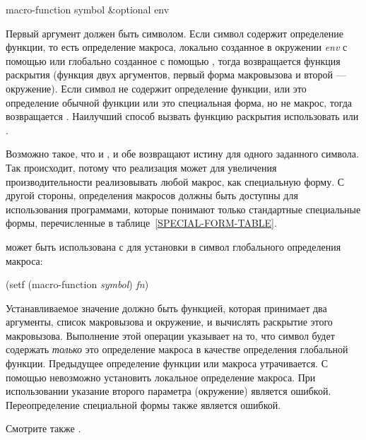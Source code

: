 \begin{defun}[Функция]
macro-function symbol &optional env

Первый аргумент должен быть символом. Если символ содержит определение функции,
то есть определение макроса, локально созданное в окружении \emph{env} с помощью
 или глобально созданное с помощью , тогда
возвращается функция раскрытия (функция двух аргументов, первый форма
макровызова и второй --- окружение).
Если символ не содержит определение функции, или это определение обычной функции
или это специальная форма, но не макрос, тогда возвращается {\false}. 
Наилучший способ вызвать функцию раскрытия использовать
 или .

Возможно такое, что и , и  обе возвращают
истину для одного заданного символа. Так происходит, потому что реализация может
для увеличения производительности реализовывать любой макрос, как специальную
форму.
С другой стороны, определения макросов должны быть доступны для использования
программами, которые понимают только стандартные специальные формы,
перечисленные в таблице~\ref{SPECIAL-FORM-TABLE}.

 может быть использована с  для установки в символ
глобального определения макроса:
\begin{lisp}
(setf (macro-function \emph{symbol}) \emph{fn})
\end{lisp}
Устанавливаемое значение должно быть функцией, которая принимает два аргументы,
список макровызова и окружение, и вычислять раскрытие этого макровызова. 
Выполнение этой операции указывает на то, что символ будет содержать \emph{только} это
определение макроса в качестве определения глобальной функции. Предыдущее
определение функции или макроса утрачивается. С помощью  невозможно
установить локальное определение макроса. При использовании  указание
второго параметра (окружение) является ошибкой.
Переопределение специальной формы также является ошибкой.

Смотрите также .
\end{defun}


